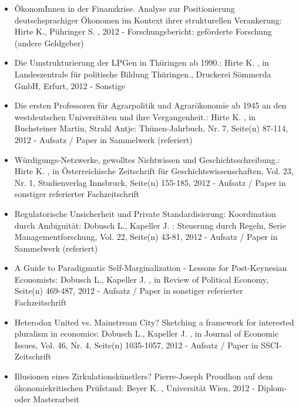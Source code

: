 \begin{itemize}
	 \item ÖkonomInnen in der Finanzkrise. Analyse zur Positionierung deutschsprachiger Ökonomen im Kontext ihrer strukturellen Verankerung: Hirte K., Pühringer S. , 2012 - Forschungsbericht: geförderte Forschung (andere Geldgeber)
	 \item Die Umstrukturierung der LPGen in Thüringen ab 1990.: Hirte K. , in Landeszentrale für politische Bildung Thüringen., Druckerei Sömmerda GmbH, Erfurt, 2012 - Sonstige
	 \item Die ersten Professoren für Agrarpolitik und Agrarökonomie ab 1945 an den westdeutschen Universitäten und ihre Vergangenheit.: Hirte K. , in Buchsteiner Martin, Strahl Antje: Thünen-Jahrbuch, Nr. 7, Seite(n) 87-114, 2012 - Aufsatz / Paper in Sammelwerk (referiert)
	 \item Würdigungs-Netzwerke, gewolltes Nichtwissen und Geschichtsschreibung.: Hirte K. , in Österreichische Zeitschrift für Geschichtswissenschaften, Vol. 23, Nr. 1, Studienverlag Innsbruck, Seite(n) 155-185, 2012 - Aufsatz / Paper in sonstiger referierter Fachzeitschrift
	 \item Regulatorische Unsicherheit und Private Standardisierung: Koordination durch Ambiguität: Dobusch L., Kapeller J. : Steuerung durch Regeln, Serie Managementforschung, Vol. 22, Seite(n) 43-81, 2012 - Aufsatz / Paper in Sammelwerk (referiert)
	 \item A Guide to Paradigmatic Self-Marginalization - Lessons for Post-Keynesian Economists: Dobusch L., Kapeller J. , in Review of Political Economy, Seite(n) 469-487, 2012 - Aufsatz / Paper in sonstiger referierter Fachzeitschrift
	 \item Heterodox United vs. Mainstream City? Sketching a framework for interested pluralism in economics: Dobusch L., Kapeller J. , in Journal of Economic Issues, Vol. 46, Nr. 4, Seite(n) 1035-1057, 2012 - Aufsatz / Paper in SSCI-Zeitschrift
	 \item Illusionen eines Zirkulationskünstlers? Pierre-Joseph Proudhon auf dem ökonomiekritischen Prüfstand: Beyer K. , Universität Wien, 2012 - Diplom- oder Masterarbeit
\end{itemize} 
